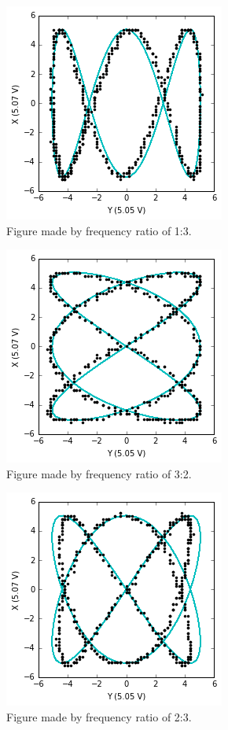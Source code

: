 \documentclass[twoside]{article}
\begin{document}
\begin{figure}[h!]
\centering
\includegraphics[scale=0.5]{1to3}
\caption{ Figure made by frequency ratio of 1:3.}
\label{fig:oscilloscope}
\end{figure}

\begin{figure}[h!]
\centering
\includegraphics[scale=0.5]{1to2thirds}
\caption{ Figure made by frequency ratio of 3:2.}
\label{fig:oscilloscope}
\end{figure}

\begin{figure}[h!]
\centering
\includegraphics[scale=0.5]{1to3halves}
\caption{ Figure made by frequency ratio of 2:3.}
\label{fig:oscilloscope}
\end{figure}
\end{document}
